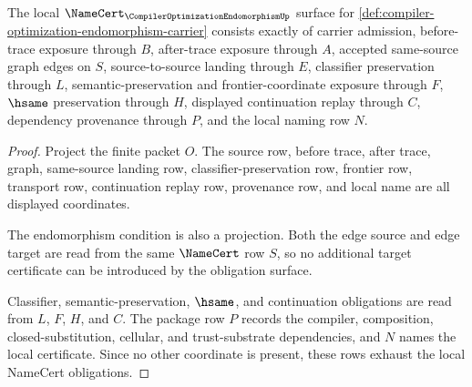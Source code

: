 \begin{theorem}
\label{thm:compiler-optimization-endomorphism-namecert-obligations}
The local $\NameCert_{\CompilerOptimizationEndomorphismUp}$ surface for \autoref{def:compiler-optimization-endomorphism-carrier} consists exactly of carrier admission, before-trace exposure through $B$, after-trace exposure through $A$, accepted same-source graph edges on $S$, source-to-source landing through $E$, classifier preservation through $L$, semantic-preservation and frontier-coordinate exposure through $F$, $\hsame$ preservation through $H$, displayed continuation replay through $C$, dependency provenance through $P$, and the local naming row $N$.
\end{theorem}
\begin{proof}
Project the finite packet $O$. The source row, before trace, after trace, graph, same-source landing row, classifier-preservation row, frontier row, transport row, continuation replay row, provenance row, and local name are all displayed coordinates.

The endomorphism condition is also a projection. Both the edge source and edge target are read from the same $\NameCert$ row $S$, so no additional target certificate can be introduced by the obligation surface.

Classifier, semantic-preservation, $\hsame$, and continuation obligations are read from $L$, $F$, $H$, and $C$. The package row $P$ records the compiler, composition, closed-substitution, cellular, and trust-substrate dependencies, and $N$ names the local certificate. Since no other coordinate is present, these rows exhaust the local NameCert obligations.
\end{proof}

